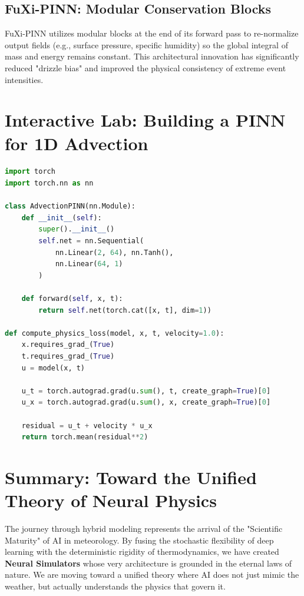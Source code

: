 \subsection{FuXi-PINN: Modular Conservation Blocks}
FuXi-PINN utilizes modular blocks at the end of its forward pass to re-normalize output fields (e.g., surface pressure, specific humidity) so the global integral of mass and energy remains constant. This architectural innovation has significantly reduced "drizzle bias" and improved the physical consistency of extreme event intensities.

\section{Interactive Lab: Building a PINN for 1D Advection}

\begin{lstlisting}[language=Python, caption=PyTorch Implementation of a simple PINN]
import torch
import torch.nn as nn

class AdvectionPINN(nn.Module):
    def __init__(self):
        super().__init__()
        self.net = nn.Sequential(
            nn.Linear(2, 64), nn.Tanh(),
            nn.Linear(64, 1)
        )
    
    def forward(self, x, t):
        return self.net(torch.cat([x, t], dim=1))

def compute_physics_loss(model, x, t, velocity=1.0):
    x.requires_grad_(True)
    t.requires_grad_(True)
    u = model(x, t)
    
    u_t = torch.autograd.grad(u.sum(), t, create_graph=True)[0]
    u_x = torch.autograd.grad(u.sum(), x, create_graph=True)[0]
    
    residual = u_t + velocity * u_x
    return torch.mean(residual**2)
\end{lstlisting}

\section{Summary: Toward the Unified Theory of Neural Physics}

The journey through hybrid modeling represents the arrival of the "Scientific Maturity" of AI in meteorology. By fusing the stochastic flexibility of deep learning with the deterministic rigidity of thermodynamics, we have created \textbf{Neural Simulators} whose very architecture is grounded in the eternal laws of nature. We are moving toward a unified theory where AI does not just mimic the weather, but actually understands the physics that govern it.

